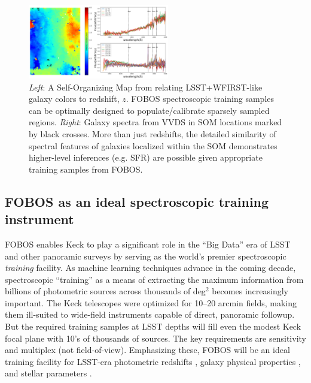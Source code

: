 
\begin{figure} %
\includegraphics[width=0.55\textwidth]{figs/Hemmati18_Fig8_VVDS_spec.png}
\caption{\small {\it Left}: A Self-Organizing Map
\citep[SOM;][]{1990Natur.346...24K} from \citet{hemmati18} relating
LSST+WFIRST-like galaxy colors to redshift, $z$. FOBOS spectroscopic
training samples can be optimally designed to populate/calibrate
sparsely sampled regions. {\it Right}: Galaxy spectra from VVDS
\citep{2005A&A...439..845L} in SOM locations marked by black crosses.
More than just redshifts, the detailed similarity of spectral
features of galaxies localized within the SOM demonstrates
higher-level inferences (e.g. SFR) are possible given appropriate
training samples from FOBOS.} \label{fig:SOM} \end{figure}


\subsection{FOBOS as an ideal spectroscopic training instrument}
\label{sec:datascience}

FOBOS enables Keck to play a significant role in the ``Big Data'' era
of LSST and other panoramic surveys by serving as the world's premier
spectroscopic \emph{training} facility. As machine learning
techniques advance in the coming decade, spectroscopic ``training''
as a means of extracting the maximum information from billions of
photometric sources across thousands of deg$^2$ becomes increasingly
important. The Keck telescopes were optimized for 10--20 arcmin
fields, making them ill-suited to wide-field instruments capable of
direct, panoramic followup. But the required training samples at LSST
depths will fill even the modest Keck focal plane with 10's of
thousands of sources. The key requirements are sensitivity and
multiplex (not field-of-view). Emphasizing these, FOBOS will be an
ideal training facility for LSST-era photometric redshifts
\citep[see][]{salvato19}, galaxy physical properties
\citep[e.g.,][]{davidzon19}, and stellar parameters
\citep[e.g.,][]{2018arXiv180401530T}.


